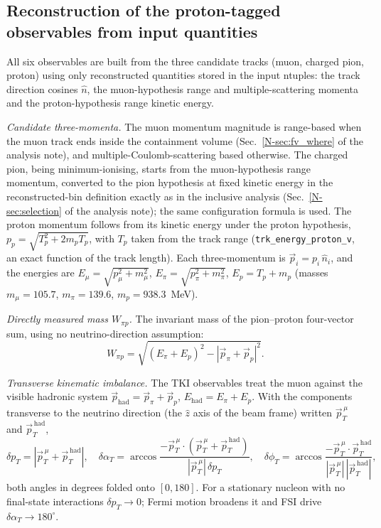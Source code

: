\documentclass[11pt,a4paper]{article}
\newcommand{\noteref}[2]{#1~\ref{N-#2} of the analysis note}
\begin{document}
\subsection{Reconstruction of the proton-tagged observables from input quantities}
\label{sec:wtki_reco}
All six observables are built from the three candidate tracks (muon, charged pion,
proton) using only reconstructed quantities stored in the input ntuples: the track
direction cosines $\hat n$, the muon-hypothesis range and multiple-scattering momenta and
the proton-hypothesis range kinetic energy.

\emph{Candidate three-momenta.} The muon momentum magnitude is range-based when the muon
track ends inside the containment volume (\noteref{Sec.}{sec:fv_where}), and
multiple-Coulomb-scattering based otherwise.
The charged pion, being minimum-ionising, starts from the muon-hypothesis range momentum, converted to the pion hypothesis at fixed kinetic
energy in the reconstructed-bin definition exactly as in the inclusive analysis
(\noteref{Sec.}{sec:selection}); the same configuration formula is used. The proton momentum follows from its
kinetic energy under the proton hypothesis,
$p_p=\sqrt{T_p^2+2m_pT_p}$, with $T_p$ taken from the track range (\texttt{trk\_energy\_proton\_v}, an
exact function of the track length). Each
three-momentum is $\vec p_i=p_i\,\hat n_i$, and the energies are
$E_\mu=\sqrt{p_\mu^2+m_\mu^2}$, $E_\pi=\sqrt{p_\pi^2+m_\pi^2}$, $E_p=T_p+m_p$
(masses $m_\mu=105.7$, $m_\pi=139.6$, $m_p=938.3$~MeV).

\emph{Directly measured mass $W_{\pi p}$.} The invariant mass of the pion--proton
four-vector sum, using no neutrino-direction assumption:
\[
  W_{\pi p}=\sqrt{(E_\pi+E_p)^2-|\vec p_\pi+\vec p_p|^2}.
\]

\emph{Transverse kinematic imbalance.} The TKI observables treat the muon against the
visible hadronic system $\vec p_\mathrm{had}=\vec p_\pi+\vec p_p$,
$E_\mathrm{had}=E_\pi+E_p$. With the components transverse to the neutrino direction (the $\hat z$ axis of the beam frame) written
$\vec p_T^{\,\mu}$ and $\vec p_T^{\,\mathrm{had}}$,
\[
  \delta p_T=|\vec p_T^{\,\mu}+\vec p_T^{\,\mathrm{had}}|,\quad
  \delta\alpha_T=\arccos\frac{-\vec p_T^{\,\mu}\!\cdot(\vec p_T^{\,\mu}+\vec p_T^{\,\mathrm{had}})}{|\vec p_T^{\,\mu}|\,\delta p_T},\quad
  \delta\phi_T=\arccos\frac{-\vec p_T^{\,\mu}\!\cdot\vec p_T^{\,\mathrm{had}}}{|\vec p_T^{\,\mu}|\,|\vec p_T^{\,\mathrm{had}}|},
\]
both angles in degrees folded onto $[0,180]$. For a stationary nucleon with no
final-state interactions $\delta p_T\to0$; Fermi motion broadens it and FSI drive
$\delta\alpha_T\to180^\circ$.
\end{document}
